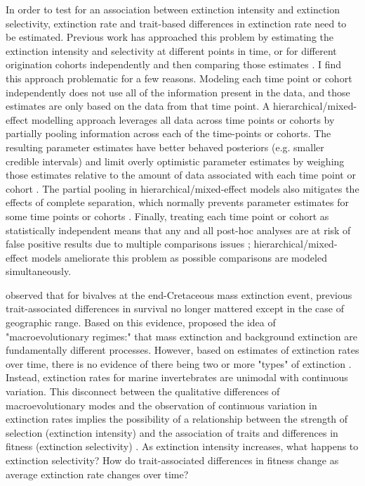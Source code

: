\documentclass[11pt]{article}
\begin{document}
In order to test for an association between extinction intensity and extinction selectivity, extinction rate and trait-based differences in extinction rate need to be estimated. Previous work has approached this problem by estimating the extinction intensity and selectivity at different points in time, or for different origination cohorts independently and then comparing those estimates \citep{Payne2016}. I find this approach problematic for a few reasons.  Modeling each time point or cohort independently does not use all of the information present in the data, and those estimates are only based on the data from that time point. A hierarchical/mixed-effect modelling approach leverages all data across time points or cohorts by partially pooling information across each of the time-points or cohorts. The resulting parameter estimates have better behaved posteriors (e.g. smaller credible intervals) and limit overly optimistic parameter estimates by weighing those estimates relative to the amount of data associated with each time point or cohort \citep{Gelman2013d}. The partial pooling in hierarchical/mixed-effect models also mitigates the effects of complete separation, which normally prevents parameter estimates for some time points or cohorts \citep{Payne2016,Gelman2013d}. Finally, treating each time point or cohort as statistically independent means that any and all post-hoc analyses are at risk of false positive results due to multiple comparisons issues \citep{Gelman2007,Gelman2013d}; hierarchical/mixed-effect models ameliorate this problem as possible comparisons are modeled simultaneously.

\citet{Jablonski1986} observed that for bivalves at the end-Cretaceous mass extinction event, previous trait-associated differences in survival no longer mattered except in the case of geographic range. Based on this evidence, \citet{Jablonski1986} proposed the idea of "macroevolutionary regimes:" that mass extinction and background extinction are fundamentally different processes. However, based on estimates of extinction rates over time, there is no evidence of there being two or more "types" of extinction \citep{Wang2003}. Instead, extinction rates for marine invertebrates are unimodal with continuous variation. This disconnect between the qualitative differences of macroevolutionary modes and the observation of continuous variation in extinction rates implies the possibility of a relationship between the strength of selection (extinction intensity) and the association of traits and differences in fitness (extinction selectivity) \citep{Payne2016}. As extinction intensity increases, what happens to extinction selectivity? How do trait-associated differences in fitness change as average extinction rate changes over time?
\end{document}
